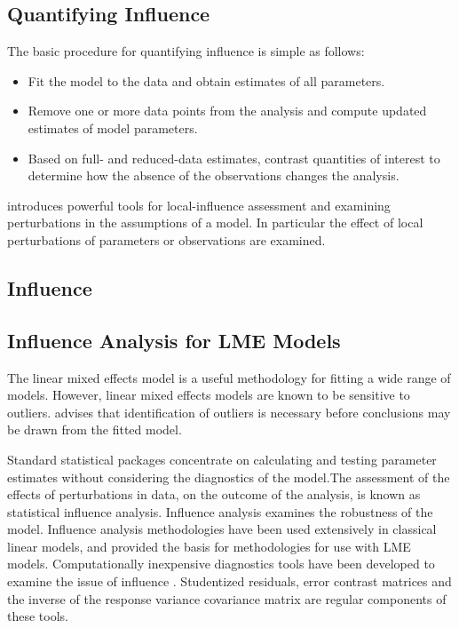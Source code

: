 \documentclass[12pt, a4paper]{article}
\begin{document}
\subsection{Quantifying Influence}  %


The basic procedure for quantifying influence is simple as follows:


\begin{itemize}
	\item Fit the model to the data and obtain estimates of all parameters.
	\item Remove one or more data points from the analysis and compute updated estimates of model parameters.
	\item Based on full- and reduced-data estimates, contrast quantities of interest to determine how the absence of the observations changes the analysis.
\end{itemize}


\citet{cook86} introduces powerful tools for local-influence assessment and examining perturbations in the assumptions of a model. In particular the effect of local perturbations of parameters or observations are examined.




	\subsection{Influence}

	
	\subsection{Influence Analysis for LME Models} %
	The linear mixed effects model is a useful methodology for fitting a wide range of models. However, linear mixed effects models are known to be sensitive to outliers. \citet{CPJ} advises that identification of outliers is necessary before conclusions may be drawn from the fitted model.
	
	Standard statistical packages concentrate on calculating and testing parameter estimates without considering the diagnostics of the model.The assessment of the effects of perturbations in data, on the outcome of the analysis, is known as statistical influence analysis. Influence analysis examines the robustness of the model. Influence analysis methodologies have been used extensively in classical linear models, and provided the basis for methodologies for use with LME models.
	Computationally inexpensive diagnostics tools have been developed to examine the issue of influence \citep{Zewotir}.
	Studentized residuals, error contrast matrices and the inverse of the response variance covariance matrix are regular components of these tools.
	
\end{document}
